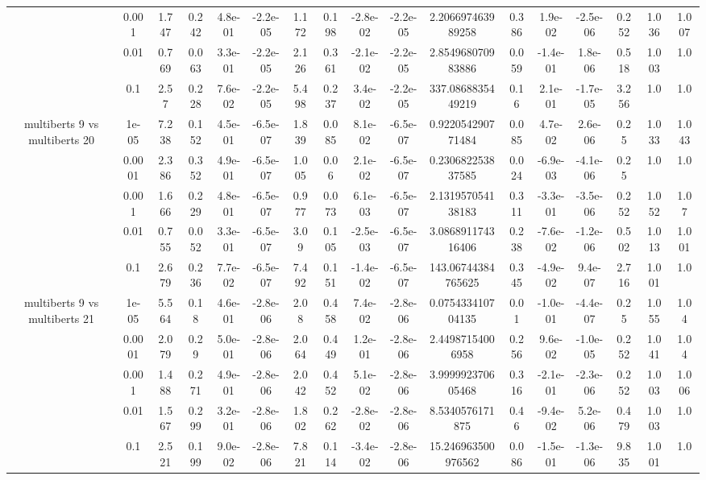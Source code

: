 \begin{tabular}{|c|c|c|c|c|c|c|c|c|c|c|c|c|c|c|c|c|}
 & 0.001 & 1.747 & 0.242 & 4.8e-01 & -2.2e-05 & 1.172 & 0.198 & -2.8e-02 & -2.2e-05 & 2.206697463989258 & 0.386 & 1.9e-02 & -2.5e-06 & 0.252 & 1.036 & 1.007 \\
 & 0.01 & 0.769 & 0.063 & 3.3e-01 & -2.2e-05 & 2.126 & 0.361 & -2.1e-02 & -2.2e-05 & 2.854968070983886 & 0.059 & -1.4e-01 & 1.8e-06 & 0.518 & 1.003 & 1.0 \\
 & 0.1 & 2.57 & 0.228 & 7.6e-02 & -2.2e-05 & 5.498 & 0.237 & 3.4e-02 & -2.2e-05 & 337.0868835449219 & 0.16 & 2.1e-01 & -1.7e-05 & 3.256 & 1.0 & 1.0 \\
\hline
\multirow{5}{*}{multiberts 9 vs multiberts 20} & 1e-05 & 7.238 & 0.152 & 4.5e-01 & -6.5e-07 & 1.839 & 0.085 & 8.1e-02 & -6.5e-07 & 0.922054290771484 & 0.085 & 4.7e-02 & 2.6e-06 & 0.25 & 1.033 & 1.043 \\
 & 0.0001 & 2.386 & 0.352 & 4.9e-01 & -6.5e-07 & 1.005 & 0.06 & 2.1e-02 & -6.5e-07 & 0.230682253837585 & 0.024 & -6.9e-03 & -4.1e-06 & 0.25 & 1.0 & 1.0 \\
 & 0.001 & 1.666 & 0.229 & 4.8e-01 & -6.5e-07 & 0.977 & 0.073 & 6.1e-03 & -6.5e-07 & 2.131957054138183 & 0.311 & -3.3e-01 & -3.5e-06 & 0.252 & 1.052 & 1.07 \\
 & 0.01 & 0.755 & 0.052 & 3.3e-01 & -6.5e-07 & 3.09 & 0.105 & -2.5e-03 & -6.5e-07 & 3.086891174316406 & 0.238 & -7.6e-02 & -1.2e-06 & 0.502 & 1.013 & 1.001 \\
 & 0.1 & 2.679 & 0.236 & 7.7e-02 & -6.5e-07 & 7.492 & 0.151 & -1.4e-02 & -6.5e-07 & 143.06744384765625 & 0.345 & -4.9e-02 & 9.4e-07 & 2.716 & 1.001 & 1.0 \\
\hline
\multirow{5}{*}{multiberts 9 vs multiberts 21} & 1e-05 & 5.564 & 0.18 & 4.6e-01 & -2.8e-06 & 2.08 & 0.458 & 7.4e-02 & -2.8e-06 & 0.075433410704135 & 0.01 & -1.0e-01 & -4.4e-07 & 0.25 & 1.055 & 1.04 \\
 & 0.0001 & 2.079 & 0.29 & 5.0e-01 & -2.8e-06 & 2.064 & 0.449 & 1.2e-01 & -2.8e-06 & 2.44987154006958 & 0.256 & 9.6e-02 & -1.0e-05 & 0.252 & 1.041 & 1.04 \\
 & 0.001 & 1.488 & 0.271 & 4.9e-01 & -2.8e-06 & 2.042 & 0.452 & 5.1e-02 & -2.8e-06 & 3.999992370605468 & 0.316 & -2.1e-01 & -2.3e-06 & 0.252 & 1.003 & 1.006 \\
 & 0.01 & 1.567 & 0.299 & 3.2e-01 & -2.8e-06 & 1.802 & 0.262 & -2.8e-02 & -2.8e-06 & 8.5340576171875 & 0.46 & -9.4e-02 & 5.2e-06 & 0.479 & 1.003 & 1.0 \\
 & 0.1 & 2.521 & 0.199 & 9.0e-02 & -2.8e-06 & 7.821 & 0.114 & -3.4e-02 & -2.8e-06 & 15.246963500976562 & 0.086 & -1.5e-01 & -1.3e-06 & 9.835 & 1.001 & 1.0 \\

\end{tabular}
